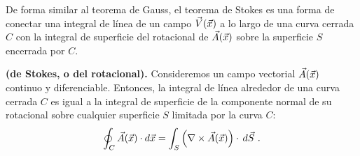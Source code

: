 
De forma similar al teorema de Gauss, el teorema de Stokes es una forma de conectar una integral de línea de un campo $\vec{V}(\vec{x})$ a lo largo de una curva cerrada $C$ con la integral de superficie del rotacional de $\vec{A}(\vec{x})$ sobre la superficie $S$ encerrada por $C$.

\begin{teorema}{\textbf{(de Stokes, o del rotacional).}} 
    Consideremos un campo vectorial $\vec{A}(\vec{x})$ continuo y diferenciable. Entonces, la integral de línea alrededor de una curva cerrada $C$ es igual a la integral de superficie de la componente normal de su rotacional sobre cualquier superficie $S$ limitada por la curva $C$:
    \begin{equation}
        \oint_C \vec{A}(\x) \cdot d\x =  \int_S \left( \nabla \times \vec{A}(\x) \right) \cdot \, d\vec{S} \ .
    \end{equation}
\end{teorema}


